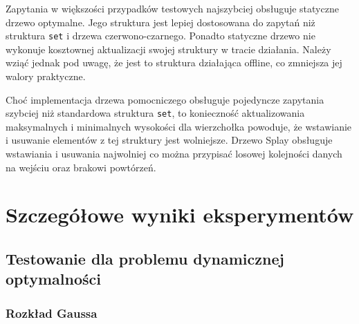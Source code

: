 \documentclass[declaration,shortabstract]{iithesis}
\theoremstyle{thm}
\theoremstyle{remark}
\theoremstyle{plain}
\theoremstyle{plain}
\theoremstyle{plain}
\begin{document}
Zapytania w większości przypadków testowych najszybciej obsługuje statyczne drzewo optymalne. Jego struktura jest lepiej dostosowana do zapytań niż struktura \texttt{set} i drzewa czerwono-czarnego. Ponadto statyczne drzewo nie wykonuje kosztownej aktualizacji swojej struktury w tracie działania. Należy wziąć jednak pod uwagę, że jest to struktura działająca offline, co zmniejsza jej walory praktyczne.
  
Choć implementacja drzewa pomocniczego obsługuje pojedyncze zapytania szybciej niż standardowa struktura \texttt{set}, to konieczność aktualizowania maksymalnych i minimalnych wysokości dla wierzchołka powoduje, że wstawianie i usuwanie elementów z tej struktury jest wolniejsze. Drzewo Splay obsługuje wstawiania i usuwania najwolniej co można przypisać losowej kolejności danych na wejściu oraz brakowi powtórzeń. 

\printbibliography

\appendix
\chapter{Szczegółowe wyniki eksperymentów}\label{app1}

\section{Testowanie dla problemu dynamicznej optymalności}
\subsection{Rozkład Gaussa}
\end{document}
